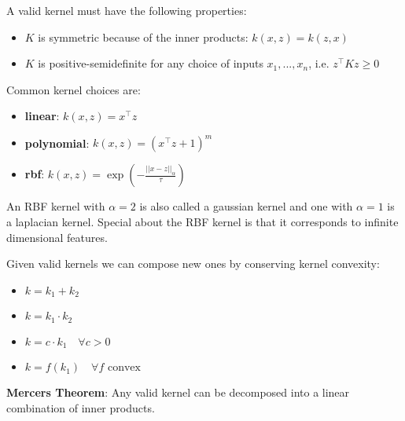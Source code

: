 A valid kernel must have the following properties:
\begin{itemize}
	\item $K$ is symmetric because of the inner products: $k(x,z) = k(z,x)$
	\item $K$ is positive-semidefinite for any choice of inputs $x_1, ..., x_n$, i.e. $z^\top K z \geq 0$
\end{itemize}

Common kernel choices are:
\begin{itemize}
	\item \textbf{linear}: $k(x, z) = x^\top z$
	\item \textbf{polynomial}: $k(x, z) = (x^\top z + 1)^m$
	\item \textbf{rbf}: $k(x, z) = \exp \left( -\frac{||x - z||_\alpha}{\tau} \right)$
\end{itemize}

An RBF kernel with $\alpha = 2$ is also called a gaussian kernel and one with $\alpha = 1$ is a laplacian kernel. Special about the RBF kernel is that it corresponds to infinite dimensional features.

Given valid kernels we can compose new ones by conserving kernel convexity:
\begin{itemize}
	\item $k = k_1 + k_2$
	\item $k = k_1 \cdot k_2$
	\item $k = c \cdot k_1 \quad \forall c > 0$
	\item $k = f(k_1) \quad \forall f \text{ convex}$
\end{itemize}

\textbf{Mercers Theorem}: Any valid kernel can be decomposed into a linear combination of inner products.